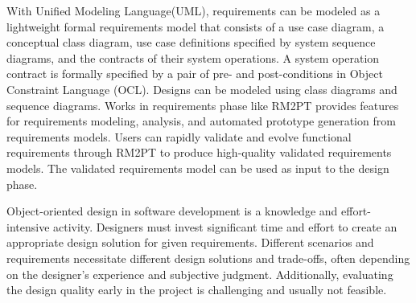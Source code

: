 \documentclass[pdflatex,sn-mathphys-num]{sn-jnl}%
\theoremstyle{thmstyleone}%
\theoremstyle{thmstyletwo}%
\theoremstyle{thmstylethree}%
\begin{document}
With Unified Modeling Language(UML), requirements can be modeled as a lightweight formal requirements model that consists of a use case diagram, a conceptual class diagram, use case definitions specified by system sequence diagrams, and the contracts of their system operations\cite{RM1, RM2, RM3}. 
A system operation contract is formally specified by a pair of pre- and post-conditions in Object Constraint Language (OCL). 
Designs can be modeled using class diagrams and sequence diagrams. 
Works in requirements phase like RM2PT\cite{YangICSE19, YangRE, YangTR, RM2Doc} provides features for requirements modeling, analysis, and automated prototype generation from requirements models. 
Users can rapidly validate and evolve functional requirements through RM2PT to produce high-quality validated requirements models. 
The validated requirements model can be used as input to the design phase.


Object-oriented design in software development is a knowledge and effort-intensive activity. Designers must invest significant time and effort to create an appropriate design solution for given requirements. Different scenarios and requirements necessitate different design solutions and trade-offs, often depending on the designer's experience and subjective judgment. Additionally, evaluating the design quality early in the project is challenging and usually not feasible. 
\end{document}
